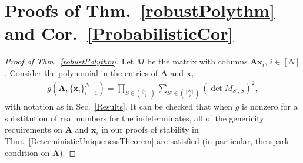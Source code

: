 \documentclass[9pt,twocolumn]{pnas-new}
\begin{document}
\section{Proofs of Thm.~\ref{robustPolythm} and Cor.~\ref{ProbabilisticCor}}\label{AppendixB} %



\begin{proof}[Proof of Thm.~\ref{robustPolythm}]
Let $M$ be the matrix with columns $\mathbf{A}\mathbf{x}_i$, $i \in [N]$.  Consider the polynomial \cite[Sec.~IV]{Hillar15} in the entries of $\mathbf{A}$ and $\mathbf{x}_i$:
\begin{align*}
g(\mathbf{A}, \{\mathbf{x}_i\}_{i=1}^N) = \prod_{S \in {[n] \choose k}} \sum_{S' \in {[N] \choose k}} (\det M_{S',S})^2,
\end{align*}
with notation as in Sec.~\ref{Results}.  
It can be checked that when $g$ is nonzero for a substitution of real numbers for the indeterminates, all of the genericity requirements on $\mathbf{A}$ and $\mathbf{x}_i$ in our proofs of stability in Thm.~\ref{DeterministicUniquenessTheorem} are satisfied (in particular, the spark condition on $\mathbf{A}$). %
\end{proof}
\end{document}
